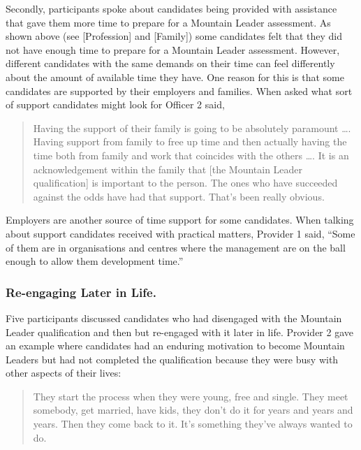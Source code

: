\documentclass[
  12pt,
  a4paper,
]{book}
\begin{document}
Secondly, participants spoke about candidates being provided with assistance that gave them more time to prepare for a Mountain Leader assessment. As shown above (see {[}Profession{]} and {[}Family{]}) some candidates felt that they did not have enough time to prepare for a Mountain Leader assessment. However, different candidates with the same demands on their time can feel differently about the amount of available time they have. One reason for this is that some candidates are supported by their employers and families. When asked what sort of support candidates might look for Officer 2 said,

\begin{quote}
Having the support of their family is going to be absolutely paramount \ldots. Having support from family to free up time and then actually having the time both from family and work that coincides with the others \ldots. It is an acknowledgement within the family that {[}the Mountain Leader qualification{]} is important to the person. The ones who have succeeded against the odds have had that support. That's been really obvious.
\end{quote}

Employers are another source of time support for some candidates. When talking about support candidates received with practical matters, Provider 1 said, ``Some of them are in organisations and centres where the management are on the ball enough to allow them development time.''

\hypertarget{re-engaging-later-in-life.}{%
\subsubsection{Re-engaging Later in Life.}\label{re-engaging-later-in-life.}}

Five participants discussed candidates who had disengaged with the Mountain Leader qualification and then but re-engaged with it later in life. Provider 2 gave an example where candidates had an enduring motivation to become Mountain Leaders but had not completed the qualification because they were busy with other aspects of their lives:

\begin{quote}
They start the process when they were young, free and single. They meet somebody, get married, have kids, they don't do it for years and years and years. Then they come back to it. It's something they've always wanted to do.
\end{quote}
\end{document}
